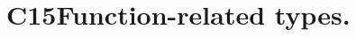 \hypertarget{group___c15_function___t_y_p_e_s}{}\section{C15\+Function-\/related types.}
\label{group___c15_function___t_y_p_e_s}
